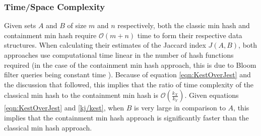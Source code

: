 \documentclass[11pt,reqno]{amsart}
\theoremstyle{remark}
\numberwithin{equation}{section}
\newcommand{\classicX}{X}
\newcommand{\containX}{Y}
\begin{document}
\subsubsection{Time/Space Complexity}
Given sets $A$ and $B$ of size $m$ and $n$ respectively, both the classic min hash and containment min hash require $\mathcal{O}(m+n)$ time to form their respective data structures. When calculating their estimates of the Jaccard index $J(A,B)$, both approaches use computational time linear in the number of hash functions required (in the case of the containment min hash approach, this is due to Bloom filter queries being constant time \cite{bloom1970space}). Because of equation \eqref{eqn:KestOverJest} and the discussion that followed, this implies that the ratio of time complexity of the classical min hash to the containment min hash is $\mathcal{O}\left(\frac{k_\classicX}{k_\containX}\right)$. Given equations \eqref{eqn:KestOverJest} and \eqref{kj/kest}, when $B$ is very large in comparison to $A$, this implies that the containment min hash approach is significantly faster than the classical min hash approach.
\end{document}
